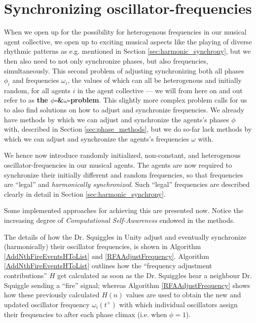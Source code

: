 \section{Synchronizing oscillator-frequencies}
\label{sec:frequency_methods}
	When we open up for the possibility for heterogenous frequencies in our musical agent collective, we open up to exciting musical aspects like the playing of diverse rhythmic patterns as e.g. mentioned in Section \ref{sec:harmonic_synchrony}, but we then also need to not only synchronize phases, but also frequencies, simultaneously. This second problem of adjusting synchronizing both all phases $\phi_i$ and frequencies $\omega_i$, the values of which can all be heterogenous and initially random, for all agents $i$ in the agent collective — we will from here on and out refer to as \textbf{the $\phi$-\&$\omega$-problem}. This slightly more complex problem calls for us to also find solutions on how to adjust and synchronize frequencies. We already have methods by which we can adjust and synchronize the agents's phases $\phi$ with, described in Section \ref{sec:phase_methods}, but we do so-far lack methods by which we can adjust and synchronize the agents's frequencies $\omega$ with.
	
	We hence now introduce randomly initialized, non-constant, and heterogenous oscillator-frequencies in our musical agents. The agents are now required to synchronize their initially different and random frequencies, so that frequencies are ``legal'' and \textit{harmonically synchronized}. Such ``legal'' frequencies are described clearly in detail in Section \ref{sec:harmonic_synchrony}.
	
	Some implemented approaches for achieving this are presented now. Notice the increasing degree of \textit{Computational Self-Awareness} endowed in the methods.
	
	The details of how the Dr. Squiggles in Unity adjust and eventually synchronize (harmonically) their oscillator frequencies, is shown in Algorithm \ref{AddNthFireEventsHToList} and \ref{RFAAdjustFrequency}. Algorithm \ref{AddNthFireEventsHToList} outlines how the ``frequency adjustment contributions'' $H$ get calculated as soon as the Dr. Squiggles hear a neighbour Dr. Squiggle sending a ``fire'' signal; whereas Algorithm \ref{RFAAdjustFrequency} shows how these previously calculated $H(n)$ values are used to obtain the new and updated oscillator frequency $\omega_i(t^+)$ with which individual oscillators assign their frequencies to after each phase climax (i.e. when $\phi=1$).
	
